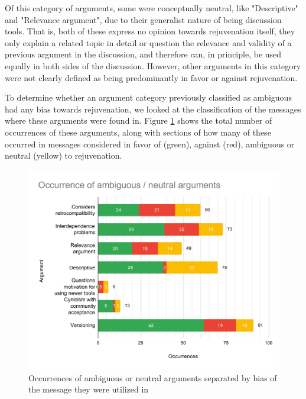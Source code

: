 Of this category of arguments, some were conceptually neutral, like "Descriptive" and "Relevance argument", due to their generalist nature of being discussion tools. That is, both of these express no opinion towards rejuvenation itself, they only explain a related topic in detail or question the relevance and validity of a previous argument in the discussion, and therefore can, in principle, be used equally in both sides of the discussion. However, other arguments in this category were not clearly defined as being predominantly in favor or against rejuvenation.

To determine whether an argument category previously classified as ambiguous had any bias towards rejuvenation, we looked at the classification of the messages where these arguments were found in. Figure \ref{fig:ambg_arg_occurr} shows the total number of occurrences of these arguments, along with sections of how many of these occurred in messages considered in favor of (green), against (red), ambiguous or neutral (yellow) to rejuvenation.

\begin{figure}[h]
  \centering
  \includegraphics[width=\linewidth]{images/ambg_arg_occurr.pdf}
  \caption{Occurrences of ambiguous or neutral arguments separated by bias of the message they were utilized in}
  \label{fig:ambg_arg_occurr}
\end{figure}

